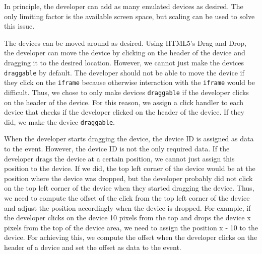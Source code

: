 In principle, the developer can add as many emulated devices as desired. The only limiting factor is the available screen space, but scaling can be used to solve this issue. 

The devices can be moved around as desired. Using HTML5's Drag and Drop, the developer can move the device by clicking on the header of the device and dragging it to the desired location. However, we cannot just make the devices \lstinline|draggable| by default. The developer should not be able to move the device if they click on the \lstinline|iframe| because otherwise interaction with the \lstinline|iframe| would be difficult. Thus, we chose to only make devices \lstinline|draggable| if the developer clicks on the header of the device. For this reason, we assign a click handler to each device that checks if the developer clicked on the header of the device. If they did, we make the device \lstinline|draggable|. 

When the developer starts dragging the device, the device ID is assigned as data to the event. However, the device ID is not the only required data. If the developer drags the device at a certain position, we cannot just assign this position to the device. If we did, the top left corner of the device would be at the position where the device was dropped, but the developer probably did not click on the top left corner of the device when they started dragging the device. Thus, we need to compute the offset of the click from the top left corner of the device and adjust the position accordingly when the device is dropped. For example, if the developer clicks on the device 10 pixels from the top and drops the device x pixels from the top of the device area, we need to assign the position x - 10 to the device. For achieving this, we compute the offset when the developer clicks on the header of a device and set the offset as data to the event.

